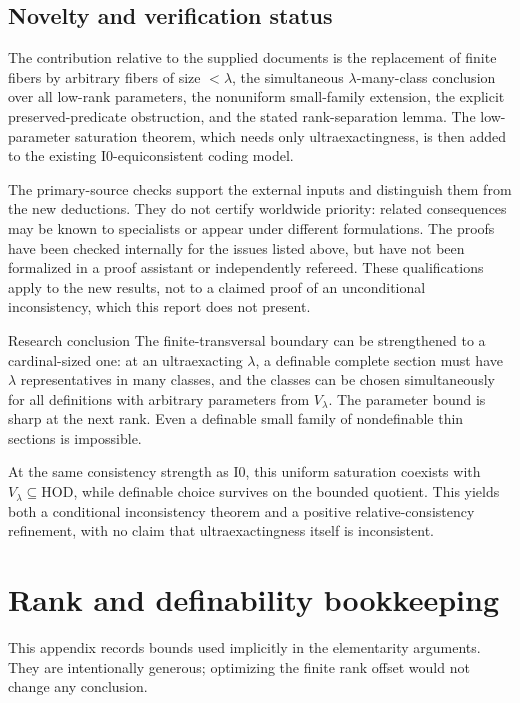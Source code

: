 \documentclass[11pt,letterpaper]{article}
\theoremstyle{definition}
\newcommand{\HOD}{\mathrm{HOD}}
\newcommand{\Izero}{\mathrm{I0}}
\numberwithin{equation}{section}
\begin{document}
\subsection{Novelty and verification status}

The contribution relative to the supplied documents is the replacement of
finite fibers by arbitrary fibers of size $<\lambda$, the simultaneous
$\lambda$-many-class conclusion over all low-rank parameters, the nonuniform small-family extension, the
explicit preserved-predicate obstruction, and the stated rank-separation
lemma. The low-parameter saturation theorem, which needs only
ultraexactingness, is then added to the
existing $\Izero$-equiconsistent coding model.

The primary-source checks support the external inputs and distinguish them
from the new deductions. They do not certify worldwide priority: related
consequences may be known to specialists or appear under different
formulations. The proofs have been checked internally for the issues
listed above, but have not been formalized in a proof assistant or
independently refereed. These qualifications apply to the new results, not
to a claimed proof of an unconditional inconsistency, which this report does
not present.

\begin{assessment}{Research conclusion}
The finite-transversal boundary can be strengthened to a cardinal-sized
one: at an ultraexacting $\lambda$, a definable complete section must have
$\lambda$ representatives in many classes, and the classes can be chosen
simultaneously for all definitions with arbitrary parameters from
$V_\lambda$. The parameter bound is sharp at the next rank.
Even a definable small family of nondefinable thin sections is impossible.

At the same consistency strength as $\Izero$, this uniform saturation
coexists with $V_\lambda\subseteq\HOD$, while definable choice survives
on the bounded quotient. This yields both a conditional
inconsistency theorem and a positive relative-consistency refinement, with
no claim that ultraexactingness itself is inconsistent.
\end{assessment}

\appendix
\section{Rank and definability bookkeeping}\label{app:ranks}

This appendix records bounds used implicitly in the elementarity arguments.
They are intentionally generous; optimizing the finite rank offset would
not change any conclusion.
\end{document}
